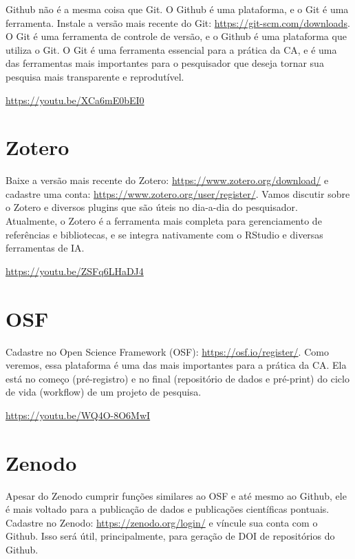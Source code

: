 \documentclass[
  a4paper,
]{book}
\begin{document}

Github não é a mesma coisa que Git. O Github é uma plataforma, e o Git é
uma ferramenta. Instale a versão mais recente do Git:
\url{https://git-scm.com/downloads}. O Git é uma ferramenta de controle
de versão, e o Github é uma plataforma que utiliza o Git. O Git é uma
ferramenta essencial para a prática da CA, e é uma das ferramentas mais
importantes para o pesquisador que deseja tornar sua pesquisa mais
transparente e reprodutível.

\url{https://youtu.be/XCa6mE0bEI0}

\section*{Zotero}\label{sec-zoteroprework}


Baixe a versão mais recente do Zotero:
\url{https://www.zotero.org/download/} e cadastre uma conta:
\url{https://www.zotero.org/user/register/}. Vamos discutir sobre o
Zotero e diversos plugins que são úteis no dia-a-dia do pesquisador.
Atualmente, o Zotero é a ferramenta mais completa para gerenciamento de
referências e bibliotecas, e se integra nativamente com o RStudio e
diversas ferramentas de IA.

\url{https://youtu.be/ZSFq6LHaDJ4}

\section*{OSF}\label{sec-osfprework}


Cadastre no Open Science Framework (OSF):
\url{https://osf.io/register/}. Como veremos, essa plataforma é uma das
mais importantes para a prática da CA. Ela está no começo (pré-registro)
e no final (repositório de dados e pré-print) do ciclo de vida
(workflow) de um projeto de pesquisa.

\url{https://youtu.be/WQ4O-8O6MwI}

\section*{Zenodo}\label{sec-zenodoprework}


Apesar do Zenodo cumprir funções similares ao OSF e até mesmo ao Github,
ele é mais voltado para a publicação de dados e publicações científicas
pontuais. Cadastre no Zenodo: \url{https://zenodo.org/login/} e víncule
sua conta com o Github. Isso será útil, principalmente, para geração de
DOI de repositórios do Github.
\end{document}
